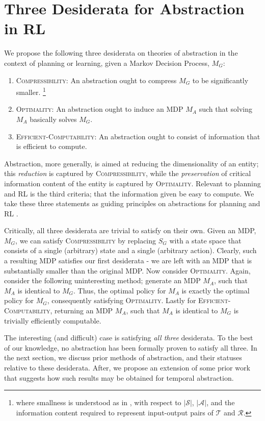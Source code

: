\section{Three Desiderata for Abstraction in RL}

We propose the following three desiderata on theories of abstraction in the context of planning or learning, given a Markov Decision Process, $M_G$:
\begin{enumerate}
\item \textsc{Compressibility}: An abstraction ought to compress $M_G$ to be significantly smaller. \footnote{where smallness is understood as in \cite{littman1995complexity}, with respect to $|\mathcal{S}|$, $|\mathcal{A}|$, and the information content required to represent input-output pairs of $\mathcal{T}$ and $\mathcal{R}$.}
\item \textsc{Optimality}: An abstraction ought to induce an MDP $M_A$ such that solving $M_A$ basically solves $M_G$.
\item \textsc{Efficient-Computability}: An abstraction ought to consist of information that is efficient to compute.
\end{enumerate}

Abstraction, more generally, is aimed at reducing the dimensionality of an entity; this {\it reduction} is captured by \textsc{Compressibility}, while the {\it preservation} of critical information content of the entity is captured by \textsc{Optimality}. Relevant to planning and RL is the third criteria; that the information given be easy to compute. We take these three statements as guiding principles on abstractions for planning and \ac{RL} .

Critically, all three desiderata are trivial to satisfy on their own. Given an \ac{MDP}, $M_G$, we can satisfy \textsc{Compressibility} by replacing $S_G$ with a state space that consists of a single (arbitrary) state and a single (arbitrary action). Clearly, such a resulting \ac{MDP} satisfies our first desiderata - we are left with an MDP that is substantially smaller than the original MDP. Now consider \textsc{Optimality}. Again, consider the following uninteresting method; generate an MDP $M_A$, such that $M_A$ is identical to $M_G$. Thus, the optimal policy for $M_A$ is exactly the optimal policy for $M_G$, consequently satisfying \textsc{Optimality}. Lastly for \textsc{Efficient-Computability}, returning an MDP $M_A$, such that $M_A$ is identical to $M_G$ is trivially efficiently computable.

The interesting (and difficult) case is satisfying {\it all three} desiderata. To the best of our knowledge, no abstraction has been formally proven to satisfy all three. In the next section, we discuss prior methods of abstraction, and their statuses relative to these desiderata. After, we propose an extension of some prior work that suggests how such results may be obtained for temporal abstraction.